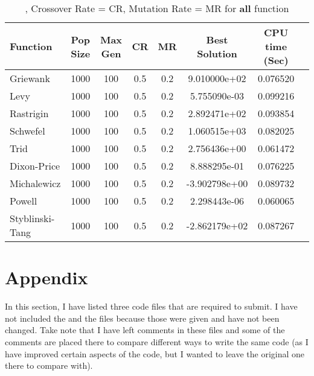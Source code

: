 \documentclass[12pt]{article}
\begin{document}
	
	
	\begin{table}[H]
		\caption{, Crossover Rate = CR, Mutation Rate = MR for \textbf{all} function}
		\label{table:2}
		\centering
		\begin{tabular}{l c c c c c c c}
			\hline
			Function & Pop Size & Max Gen & CR & MR &  Best Solution & CPU time (Sec) \\
			\hline
			Griewank & 1000    & 100  & 0.5 & 0.2 & 
9.010000e+02 &
0.076520

 & &\\
			Levy & 1000    & 100  & 0.5 & 0.2 & 
5.755090e-03 &
0.099216

    \\
			Rastrigin & 1000    & 100  & 0.5 & 0.2&  
2.892471e+02 &
0.093854

    & &\\
			Schwefel & 1000    & 100  & 0.5 & 0.2&   
1.060515e+03 &
0.082025

     & &\\
			Trid & 1000    & 100  & 0.5 & 0.2& 
2.756436e+00 &
0.061472

    \\
			Dixon-Price & 1000    & 100  & 0.5 & 0.2&  
8.888295e-01 &
0.076225

 \\
			Michalewicz & 1000    & 100  & 0.5 & 0.2& 
-3.902798e+00 &
0.089732

 &\\
			Powell & 1000    & 100  & 0.5 & 0.2& 
2.298443e-06 &
0.060065

 &  &  \\
			Styblinski-Tang & 1000    & 100  & 0.5 & 0.2& 
-2.862179e+02 &
0.087267

 \\
			\hline
		\end{tabular}
	\end{table}
	
	
	
	
	

	 
	\newpage
	\section{Appendix}
 In this section, I have listed three code files that are required to submit. I have not included the  and the  files because those were given and have not been changed. Take note that I have left comments in these files and some of the comments are placed there to compare different ways to write the same code (as I have improved certain aspects of the code, but I wanted to leave the original one there to compare with).
		
\end{document}

